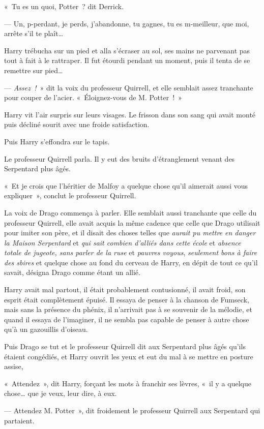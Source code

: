 «~Tu es un quoi, Potter~? dit Derrick.

--- Un, p-perdant, je perds, j'abandonne, tu gagnes, tu es m-meilleur, que moi, arrête s'il te plaît…

Harry trébucha sur un pied et alla s'écraser au sol, ses mains ne parvenant pas tout à fait à le rattraper.
Il fut étourdi pendant un moment, puis il tenta de se remettre sur pied…

--- \emph{Assez~!}~» dit la voix du professeur Quirrell, et elle semblait assez tranchante pour couper de l'acier.
«~Éloignez-vous de M. Potter~!~»

Harry vit l'air surpris sur leurs visages.
Le frisson dans son sang qui avait monté puis décliné sourit avec une froide satisfaction.

Puis Harry s'effondra sur le tapis.

Le professeur Quirrell parla.
Il y eut des bruits d'étranglement venant des Serpentard plus âgés.

«~Et je crois que l'héritier de Malfoy a quelque chose qu'il aimerait aussi vous expliquer~», conclut le professeur Quirrell.

La voix de Drago commença à parler.
Elle semblait aussi tranchante que celle du professeur Quirrell, elle avait acquis la même cadence que celle que Drago utilisait pour imiter son père, et il disait des choses telles que \emph{aurait pu mettre en danger la Maison Serpentard} et \emph{qui sait combien d'alliés dans cette école} et \emph{absence totale de jugeote, sans parler de la ruse} et \emph{pauvres voyous}, \emph{seulement bons à faire des sbires} et quelque chose au fond du cerveau de Harry, en dépit de tout ce qu'il savait, désigna Drago comme étant un allié.

Harry avait mal partout, il était probablement contusionné, il avait froid, son esprit était complètement épuisé.
Il essaya de penser à la chanson de Fumseck, mais sans la présence du phénix, il n'arrivait pas à se souvenir de la mélodie, et quand il essaya de l'imaginer, il ne sembla pas capable de penser à autre chose qu'à un gazouillis d'oiseau.

Puis Drago se tut et le professeur Quirrell dit aux Serpentard plus âgés qu'ils étaient congédiés, et Harry ouvrit les yeux et eut du mal à se mettre en posture assise,

«~Attendez~», dit Harry, forçant les mots à franchir ses lèvres, «~il y a quelque chose… que je veux, leur dire, à eux.

--- Attendez M. Potter~», dit froidement le professeur Quirrell aux Serpentard qui partaient.

